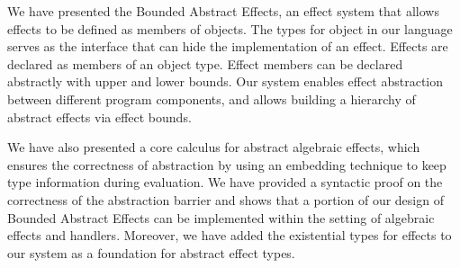 We  have presented the Bounded Abstract Effects, an effect system that allows effects to be defined as members of objects. The types for object in our language serves as the interface that can hide the implementation of an effect. Effects are declared as members of an object type. Effect members can be declared abstractly with upper and lower bounds. Our system enables effect abstraction between different program components, and allows building a hierarchy of abstract effects via effect bounds.

We  have also presented a core calculus for abstract algebraic effects, which ensures the correctness of abstraction by using an embedding technique to keep type information during evaluation. We have provided a syntactic proof on the correctness of the abstraction barrier and shows that a portion of our design of Bounded Abstract Effects can be implemented within the setting of algebraic effects and handlers.  Moreover, we have added the existential types for effects to our system as a foundation for abstract effect types. 






